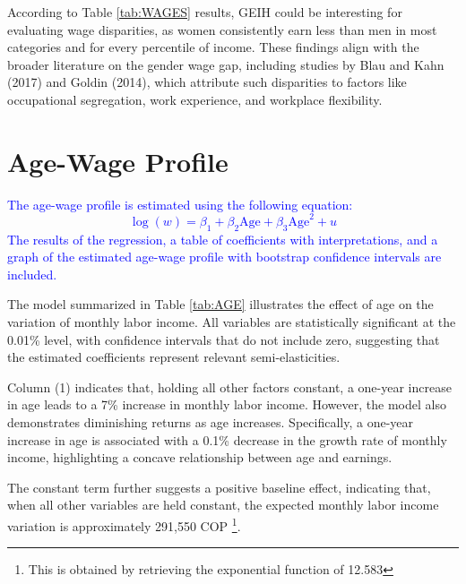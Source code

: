 \documentclass[a4paper,12pt]{article}
\begin{document}
According to Table \ref{tab:WAGES} results, GEIH could be interesting for evaluating wage disparities, as women consistently earn less than men in most categories and for every percentile of income. These findings align with the broader literature on the gender wage gap, including studies by Blau and Kahn (2017) and Goldin (2014), which attribute such disparities to factors like occupational segregation, work experience, and workplace flexibility.

\section{Age-Wage Profile}
\textcolor{blue}{The age-wage profile is estimated using the following equation:
\begin{equation}
    \log(w) = \beta_1 + \beta_2 \text{Age} + \beta_3 \text{Age}^2 + u
\end{equation}
The results of the regression, a table of coefficients with interpretations, and a graph of the estimated age-wage profile with bootstrap confidence intervals are included.}

The model summarized in Table \ref{tab:AGE} illustrates the effect of age on the variation of monthly labor income. All variables are statistically significant at the 0.01\% level, with confidence intervals that do not include zero, suggesting that the estimated coefficients represent relevant semi-elasticities.

Column (1) indicates that, holding all other factors constant, a one-year increase in age leads to a 7\% increase in monthly labor income. However, the model also demonstrates diminishing returns as age increases. Specifically, a one-year increase in age is associated with a 0.1\% decrease in the growth rate of monthly income, highlighting a concave relationship between age and earnings.

The constant term further suggests a positive baseline effect, indicating that, when all other variables are held constant, the expected monthly labor income variation is approximately 291,550 COP \footnote{This is obtained by retrieving the exponential function of 12.583}.  
\end{document}
